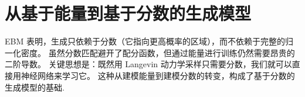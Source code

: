 



\section{\texorpdfstring{从基于能量到基于分数的生成模型}{从基于能量到基于分数的生成模型}}
EBM 表明，生成只依赖于分数（它指向更高概率的区域），而不依赖于完整的归一化密度。
虽然分数匹配避开了配分函数，但通过能量进行训练仍然需要昂贵的二阶导数。
关键思想是：既然用 Langevin 动力学采样只需要分数，我们就可以直接用神经网络来学习它。
这种从建模能量到建模分数的转变，构成了基于分数的生成模型的基础.






